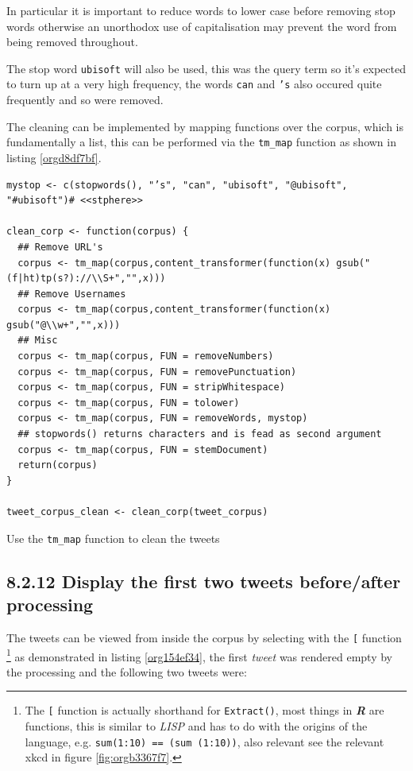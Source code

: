 \documentclass[11pt]{article}
\begin{document}
In particular it is important to reduce words to lower case before removing stop words otherwise an unorthodox use of capitalisation may prevent the word from being removed throughout.

The stop word \texttt{ubisoft} will also be used, this was the query term so it's expected to turn up at a very high frequency, the words \texttt{can} and \texttt{'s} also occured quite frequently and so were removed.

The cleaning can be implemented by mapping functions over the corpus, which is fundamentally a list, this can be performed via the \texttt{tm\_map} function as shown in listing \ref{orgd8df7bf}.



\begin{listing}[htbp]
\begin{verbatim}
mystop <- c(stopwords(), "’s", "can", "ubisoft", "@ubisoft", "#ubisoft")# <<stphere>>

clean_corp <- function(corpus) {
  ## Remove URL's
  corpus <- tm_map(corpus,content_transformer(function(x) gsub("(f|ht)tp(s?)://\\S+","",x)))
  ## Remove Usernames
  corpus <- tm_map(corpus,content_transformer(function(x) gsub("@\\w+","",x)))
  ## Misc
  corpus <- tm_map(corpus, FUN = removeNumbers)
  corpus <- tm_map(corpus, FUN = removePunctuation)
  corpus <- tm_map(corpus, FUN = stripWhitespace)
  corpus <- tm_map(corpus, FUN = tolower)
  corpus <- tm_map(corpus, FUN = removeWords, mystop)
  ## stopwords() returns characters and is fead as second argument
  corpus <- tm_map(corpus, FUN = stemDocument)
  return(corpus)
}

tweet_corpus_clean <- clean_corp(tweet_corpus)
\end{verbatim}
\caption{\label{orgd8df7bf}Use the \texttt{tm\_map} function to clean the tweets}
\end{listing}

\subsection{8.2.12 Display the first two tweets before/after processing}
\label{sec:org9508573}
The tweets can be viewed from inside the corpus by selecting with the \texttt{[} function \footnote{The \texttt{[} function is actually shorthand for \texttt{Extract()}, most things in
\textbf{\emph{R}} are functions, this is similar to \emph{LISP} and has to do with the origins of
the language, e.g. \texttt{sum(1:10) == (sum (1:10))}, also relevant see the relevant
xkcd in figure \ref{fig:orgb3367f7}.} as demonstrated in listing \ref{org154ef34}, the first \emph{tweet} was rendered empty by the processing and the following two tweets were:
\end{document}
